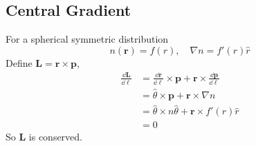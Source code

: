 \documentclass[12pt]{article}
\begin{document}
\subsection{Central Gradient}
For a spherical symmetric distribution
\begin{equation}
n(\bm r)=f(r),\quad \nabla n=f'(r)\hat r
\end{equation}
Define $\bm L=\bm r\times \bm p$,
\begin{align}
	\frac{\dd \bm L}{\dd \ell}&=\frac{\dd\bm r}{\dd \ell}\times\bm p+\bm r\times\frac{\dd\bm p}{\dd \ell}
	\\&=\hat{\theta}\times \bm p+\bm r\times\nabla n
	\\&=\hat{\theta}\times n\hat{\theta}+\bm r\times f'(r)\hat r
	\\&=0
\end{align}
So $\bm L$ is conserved.
\end{document}
